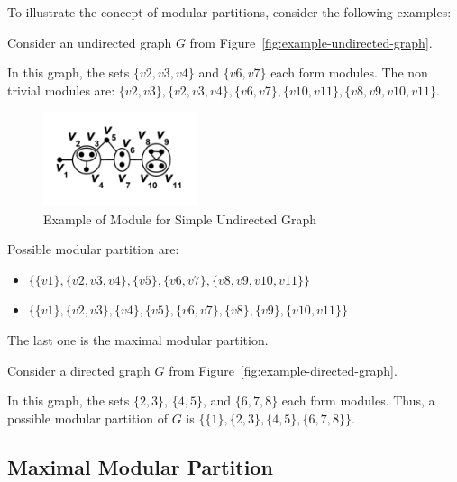 To illustrate the concept of modular partitions, consider the following examples:

\begin{myex}
    Consider an undirected graph $G$ from Figure~\ref{fig:example-undirected-graph}.

    In this graph, the sets $\{v2, v3, v4\}$ and $\{v6, v7\}$ each form modules.
    The non trivial modules are: $\{v2, v3\}, \{v2, v3, v4\}, \{v6, v7\}, \{v10, v11\}, \{v8, v9, v10, v11\}$.

    \begin{figure}[!h]
        \centering
        \includegraphics[width=0.40\textwidth]{images/graphs/undirected_graph_wikipedia_module}
        \caption{Example of Module for Simple Undirected Graph}
        \label{fig:example-undirected-graph-module}
    \end{figure}

    Possible modular partition are:
    \begin{itemize}
        \item $\{\{v1\}, \{v2, v3, v4\}, \{v5\}, \{v6, v7\}, \{v8, v9, v10, v11\}\}$
        \item $\{\{v1\}, \{v2, v3\}, \{v4\}, \{v5\}, \{v6, v7\}, \{v8\}, \{v9\}, \{v10, v11\}\}$
    \end{itemize}
    The last one is the maximal modular partition.
\end{myex}

\begin{myex}
    Consider a directed graph $G$ from Figure~\ref{fig:example-directed-graph}.

    In this graph, the sets $\{2, 3\}$, $\{4, 5\}$, and $\{6, 7, 8\}$ each form modules.
    Thus, a possible modular partition of $G$ is $\{\{1\}, \{2, 3\}, \{4, 5\}, \{6, 7, 8\}\}$.
\end{myex}

\subsection*{Maximal Modular Partition}\label{subsec:maximal-modular-partition}

